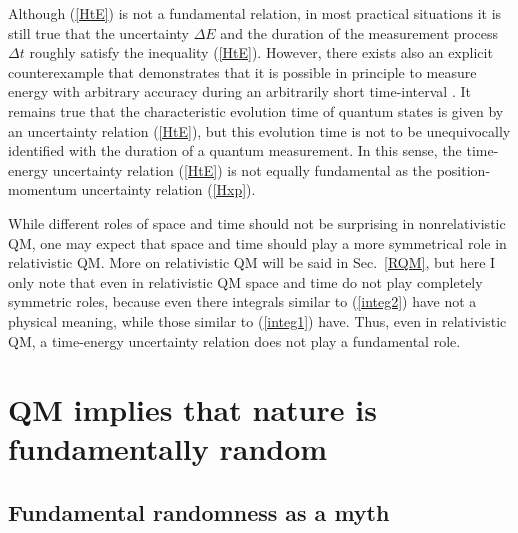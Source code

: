 \documentclass[12pt]{article}
\begin{document}
Although (\ref{HtE}) is not a fundamental relation, in most practical 
situations it is still true that the uncertainty $\Delta E$ and the duration 
of the measurement process $\Delta t$ roughly satisfy the inequality 
(\ref{HtE}). However, there exists also an explicit counterexample 
that demonstrates that it is possible in principle to measure
energy with arbitrary accuracy during an arbitrarily short time-interval
\cite{ahar}.
%
It remains true that the characteristic evolution time of quantum states
is given by an uncertainty relation (\ref{HtE}), but this 
evolution time is not to be unequivocally identified with the duration 
of a quantum measurement. In this sense, the time-energy 
uncertainty relation (\ref{HtE}) is not equally fundamental as
the position-momentum uncertainty relation (\ref{Hxp}).   


While different roles of space and time should not be surprising
in nonrelativistic QM, one may expect that space and time should play 
a more symmetrical role in relativistic QM. More on relativistic 
QM will be said in Sec.~\ref{RQM}, but here I only note that 
even in relativistic QM space and time do not play completely
symmetric roles, because even there integrals similar to (\ref{integ2})
have not a physical meaning, while those similar to (\ref{integ1})
have. Thus, even in relativistic QM, a time-energy uncertainty relation 
does not play a fundamental role.  

\section{QM implies that nature is fundamentally random} 

\subsection{Fundamental randomness as a myth}
\end{document}
